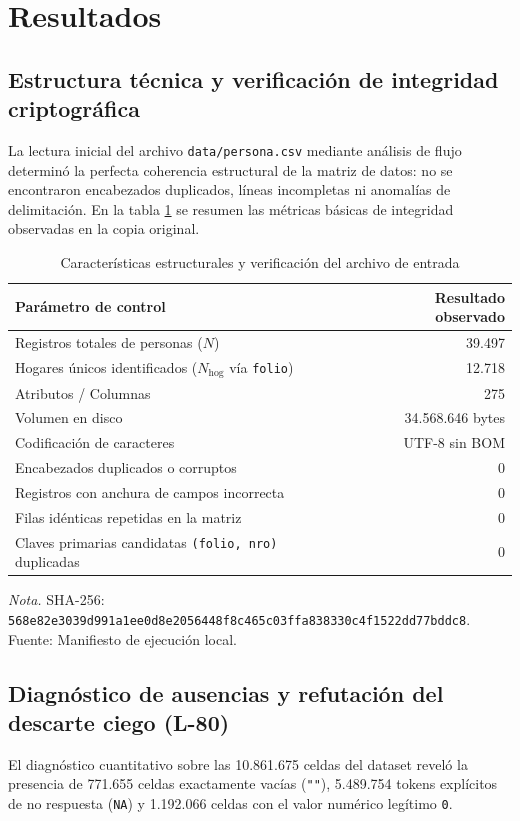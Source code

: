 \section{Resultados}

\subsection{Estructura técnica y verificación de integridad criptográfica}
La lectura inicial del archivo \texttt{data/persona.csv} mediante análisis de flujo determinó la perfecta coherencia estructural de la matriz de datos: no se encontraron encabezados duplicados, líneas incompletas ni anomalías de delimitación. En la tabla \ref{tab:estructura} se resumen las métricas básicas de integridad observadas en la copia original.

\begin{table}[htbp]
\centering
\caption{Características estructurales y verificación del archivo de entrada}
\label{tab:estructura}
\begin{tabularx}{0.88\textwidth}{Xr}
\toprule
\textbf{Parámetro de control} & \textbf{Resultado observado} \\
\midrule
Registros totales de personas ($N$) & 39.497 \\
Hogares únicos identificados ($N_{\text{hog}}$ vía \texttt{folio}) & 12.718 \\
Atributos / Columnas & 275 \\
Volumen en disco & 34.568.646 bytes \\
Codificación de caracteres & UTF-8 sin BOM \\
Encabezados duplicados o corruptos & 0 \\
Registros con anchura de campos incorrecta & 0 \\
Filas idénticas repetidas en la matriz & 0 \\
Claves primarias candidatas \texttt{(folio, nro)} duplicadas & 0 \\
\bottomrule
\end{tabularx}
\par\vspace{3pt}\parbox{0.88\textwidth}{\footnotesize\textit{Nota.} SHA-256: {\scriptsize\texttt{568e82e3039d991a1ee0d8e2056448f8c465c03ffa838330c4f1522dd77bddc8}}. Fuente: Manifiesto de ejecución local.}
\end{table}

\subsection{Diagnóstico de ausencias y refutación del descarte ciego (L-80)}
El diagnóstico cuantitativo sobre las 10.861.675 celdas del dataset reveló la presencia de 771.655 celdas exactamente vacías (\texttt{""}), 5.489.754 tokens explícitos de no respuesta (\texttt{NA}) y 1.192.066 celdas con el valor numérico legítimo \texttt{0}. 

